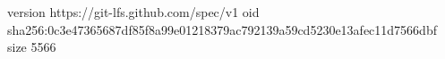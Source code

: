 version https://git-lfs.github.com/spec/v1
oid sha256:0c3e47365687df85f8a99e01218379ac792139a59cd5230e13afec11d7566dbf
size 5566
